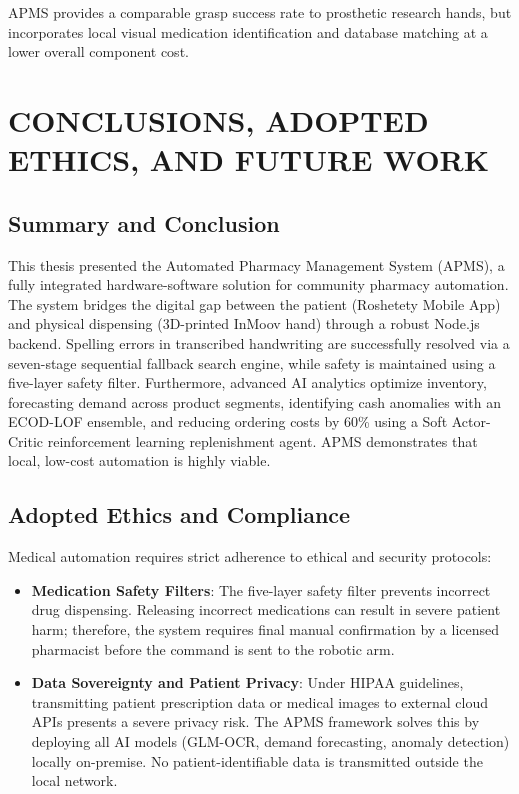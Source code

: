 \documentclass[12pt,a4paper,oneside]{report}
\begin{document}
APMS provides a comparable grasp success rate to prosthetic research
hands, but incorporates local visual medication identification and
database matching at a lower overall component cost.

\chapter{CONCLUSIONS, ADOPTED ETHICS, AND FUTURE WORK}
\label{conclusions-adopted-ethics-and-future-work}

\section{Summary and Conclusion}\label{summary-and-conclusion}

This thesis presented the Automated Pharmacy Management System (APMS), a
fully integrated hardware-software solution for community pharmacy
automation. The system bridges the digital gap between the patient
(Roshetety Mobile App) and physical dispensing (3D-printed InMoov hand)
through a robust Node.js backend. Spelling errors in transcribed
handwriting are successfully resolved via a seven-stage sequential
fallback search engine, while safety is maintained using a five-layer
safety filter. Furthermore, advanced AI analytics optimize inventory,
forecasting demand across product segments, identifying cash anomalies
with an ECOD-LOF ensemble, and reducing ordering costs by 60\% using a
Soft Actor-Critic reinforcement learning replenishment agent. APMS
demonstrates that local, low-cost automation is highly viable.

\section{Adopted Ethics and
Compliance}\label{adopted-ethics-and-compliance}

Medical automation requires strict adherence to ethical and security
protocols:

\begin{itemize}
\item
  \textbf{Medication Safety Filters}: The five-layer safety filter
  prevents incorrect drug dispensing. Releasing incorrect medications
  can result in severe patient harm; therefore, the system requires
  final manual confirmation by a licensed pharmacist before the command
  is sent to the robotic arm.
\item
  \textbf{Data Sovereignty and Patient Privacy}: Under HIPAA guidelines,
  transmitting patient prescription data or medical images to external
  cloud APIs presents a severe privacy risk. The APMS framework solves
  this by deploying all AI models (GLM-OCR, demand forecasting, anomaly
  detection) locally on-premise. No patient-identifiable data is
  transmitted outside the local network.
\end{itemize}
\end{document}
